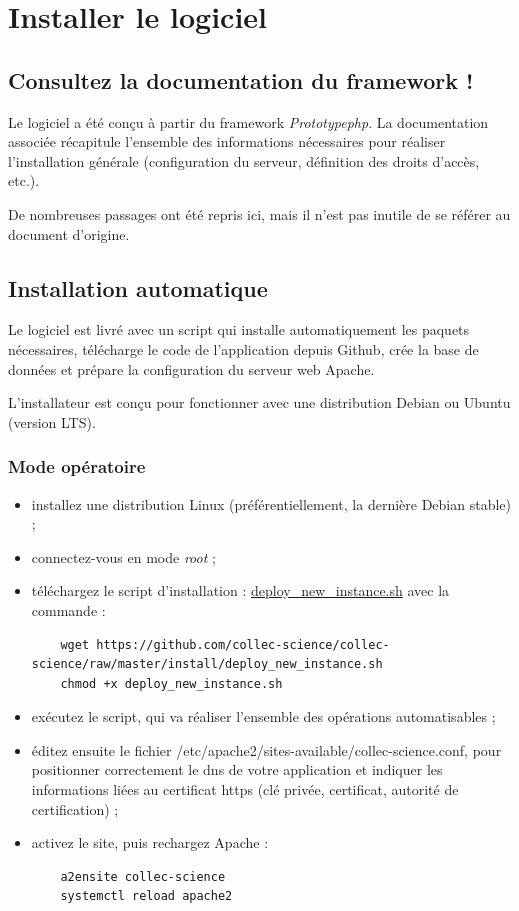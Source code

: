 \chapter{Installer le logiciel}

\section{Consultez la documentation du framework !}

Le logiciel a été conçu à partir du framework \textit{Prototypephp}. La documentation associée \cite{pphp-doc} récapitule l'ensemble des informations nécessaires pour réaliser l'installation générale (configuration du serveur, définition des droits d'accès, etc.).

De nombreuses passages ont été repris ici, mais il n'est pas inutile de se référer au document d'origine. 

\section{Installation automatique}
Le logiciel est livré avec un script qui installe automatiquement les paquets nécessaires, télécharge le code de l'application depuis Github, crée la base de données et prépare la configuration du serveur web Apache.

L'installateur est conçu pour fonctionner avec une distribution Debian ou Ubuntu (version LTS).

\subsection{Mode opératoire}
\begin{itemize}
	\item installez une distribution Linux (préférentiellement, la dernière Debian stable) ;
	\item connectez-vous en mode \textit{root} ;
	\item téléchargez le script d'installation : \href{https://github.com/Irstea/collec/raw/master/install/deploy_new_instance.sh}{deploy\_new\_instance.sh} avec la commande :
	\begin{lstlisting}
	wget https://github.com/collec-science/collec-science/raw/master/install/deploy_new_instance.sh
	chmod +x deploy_new_instance.sh
	\end{lstlisting}
	\item exécutez le script, qui va réaliser l'ensemble des opérations automatisables ;
	\item éditez ensuite le fichier /etc/apache2/sites-available/collec-science.conf, pour positionner correctement le dns de votre application et indiquer les informations liées au certificat https (clé privée, certificat, autorité de certification) ;
	\item activez le site, puis rechargez Apache :
	\begin{lstlisting}
	a2ensite collec-science
	systemctl reload apache2
	\end{lstlisting}
\end{itemize}

